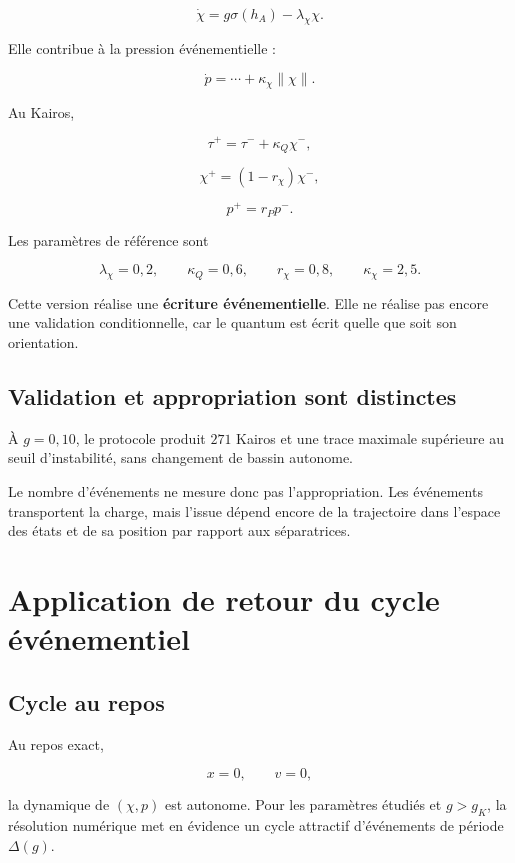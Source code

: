 \[
\dot\chi
=
g\sigma(h_A)
-
\lambda_\chi\chi.
\]

Elle contribue à la pression événementielle :

\[
\dot p
=
\cdots
+
\kappa_\chi\|\chi\|.
\]

Au Kairos,

\[
\tau^+
=
\tau^-
+
\kappa_Q\chi^-,
\]

\[
\chi^+
=
(1-r_\chi)\chi^-,
\]

\[
p^+
=
r_Pp^-.
\]

Les paramètres de référence sont

\[
\lambda_\chi=0{,}2,
\qquad
\kappa_Q=0{,}6,
\qquad
r_\chi=0{,}8,
\qquad
\kappa_\chi=2{,}5.
\]

Cette version réalise une \textbf{écriture événementielle}. Elle ne
réalise pas encore une validation conditionnelle, car le quantum est
écrit quelle que soit son orientation.

\section{Validation et appropriation sont distinctes}\label{t2-validation-et-appropriation-sont-distinctes}

À \(g=0{,}10\), le protocole produit \(271\) Kairos et une trace
maximale supérieure au seuil d'instabilité, sans changement de bassin
autonome.

Le nombre d'événements ne mesure donc pas l'appropriation. Les
événements transportent la charge, mais l'issue dépend encore de la
trajectoire dans l'espace des états et de sa position par rapport aux
séparatrices.

\chapter{Application de retour du cycle événementiel}\label{t2-application-de-retour-du-cycle-evenementiel}

\section{Cycle au repos}\label{t2-cycle-au-repos}

Au repos exact,

\[
x=0,
\qquad
v=0,
\]

la dynamique de \((\chi,p)\) est autonome. Pour les paramètres étudiés et \(g>g_K\), la résolution numérique met en évidence un cycle attractif d'événements de période \(\Delta(g).\)

